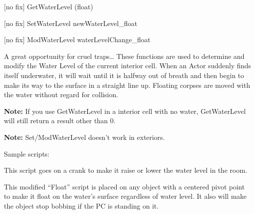 {[}no fix{]} GetWaterLevel (float)

{[}no fix{]} SetWaterLevel newWaterLevel\_float

{[}no fix{]} ModWaterLevel waterLevelChange\_float

A great opportunity for cruel traps\ldots{} These functions are used to
determine and modify the Water Level of the current interior cell. When
an Actor suddenly finds itself underwater, it will wait until it is
halfway out of breath and then begin to make its way to the surface in a
straight line up. Floating corpses are moved with the water without
regard for collision.

\textbf{Note:} If you use GetWaterLevel in a interior cell with no
water, GetWaterLevel will still return a result other than 0.

\textbf{Note:} Set/ModWaterLevel doesn't work in exteriors.

Sample scripts:

This script goes on a crank to make it raise or lower the water level in
the room.



This modified ``Float'' script is placed on any object with a centered
pivot point to make it float on the water's surface regardless of water
level. It also will make the object stop bobbing if the PC is standing
on it.

